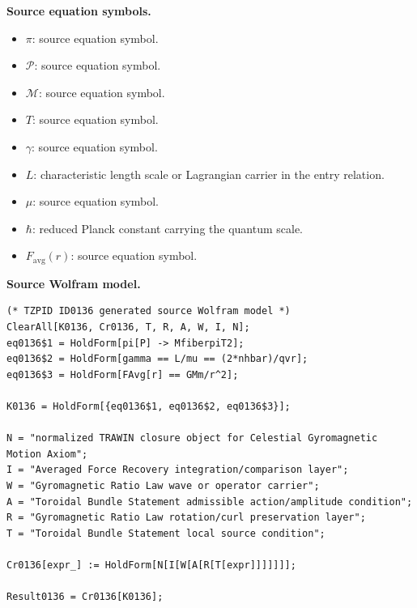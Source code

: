 \begin{minipage}[t]{0.49\linewidth}
\begingroup
\small
\raggedright
\textbf{Source equation symbols.}\par
\begin{itemize}[leftmargin=1.35em,itemsep=1pt,topsep=1pt,parsep=0pt]
    \item $\pi$: source equation symbol.
    \item $\mathcal{P}$: source equation symbol.
    \item $\mathcal{M}$: source equation symbol.
    \item $T$: source equation symbol.
    \item $\gamma$: source equation symbol.
    \item $L$: characteristic length scale or Lagrangian carrier in the entry relation.
    \item $\mu$: source equation symbol.
    \item $\hbar$: reduced Planck constant carrying the quantum scale.
    \item $F_{\mathrm{avg}}(r)$: source equation symbol.
\end{itemize}
\endgroup
\end{minipage}\hfill
\begin{minipage}[t]{0.47\linewidth}
\begingroup
\scriptsize
\raggedright
\textbf{Source Wolfram model.}\par
\begin{Verbatim}[fontsize=\tiny,breaklines=true,breakanywhere=true]
(* TZPID ID0136 generated source Wolfram model *)
ClearAll[K0136, Cr0136, T, R, A, W, I, N];
eq0136$1 = HoldForm[pi[P] -> MfiberpiT2];
eq0136$2 = HoldForm[gamma == L/mu == (2*nhbar)/qvr];
eq0136$3 = HoldForm[FAvg[r] == GMm/r^2];

K0136 = HoldForm[{eq0136$1, eq0136$2, eq0136$3}];

N = "normalized TRAWIN closure object for Celestial Gyromagnetic Motion Axiom";
I = "Averaged Force Recovery integration/comparison layer";
W = "Gyromagnetic Ratio Law wave or operator carrier";
A = "Toroidal Bundle Statement admissible action/amplitude condition";
R = "Gyromagnetic Ratio Law rotation/curl preservation layer";
T = "Toroidal Bundle Statement local source condition";

Cr0136[expr_] := HoldForm[N[I[W[A[R[T[expr]]]]]]];

Result0136 = Cr0136[K0136];
\end{Verbatim}
\endgroup
\end{minipage}

